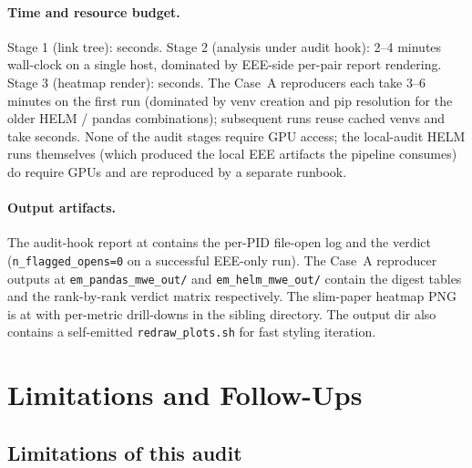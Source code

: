 \documentclass[11pt]{article}
\begin{document}
\paragraph{Time and resource budget.}
Stage 1 (link tree): seconds.
Stage 2 (analysis under audit hook): 2--4 minutes wall-clock on a
  single host, dominated by EEE-side per-pair report rendering.
Stage 3 (heatmap render): seconds.
The Case~A reproducers each take 3--6 minutes on the first run
  (dominated by venv creation and pip resolution for the older HELM
  / pandas combinations); subsequent runs reuse cached venvs and take
  seconds.
None of the audit stages require GPU access; the local-audit HELM
  runs themselves (which produced the local EEE artifacts the pipeline
  consumes) do require GPUs and are reproduced by a separate runbook.

\paragraph{Output artifacts.}
The audit-hook report at
  contains the per-PID file-open log and the verdict
  (\texttt{n\_flagged\_opens=0} on a successful EEE-only run).
The Case~A reproducer outputs at
  \texttt{em\_pandas\_mwe\_out/} and \texttt{em\_helm\_mwe\_out/}
  contain the digest tables and the rank-by-rank verdict matrix
  respectively.
The slim-paper heatmap PNG is at
   with
  per-metric drill-downs in the sibling
   directory.
The output dir also contains a self-emitted
  \texttt{redraw\_plots.sh} for fast styling iteration.


\section{Limitations and Follow-Ups}
\label{sec:tr-limitations}

\subsection{Limitations of this audit}
\label{sec:tr-limitations-list}
\end{document}
